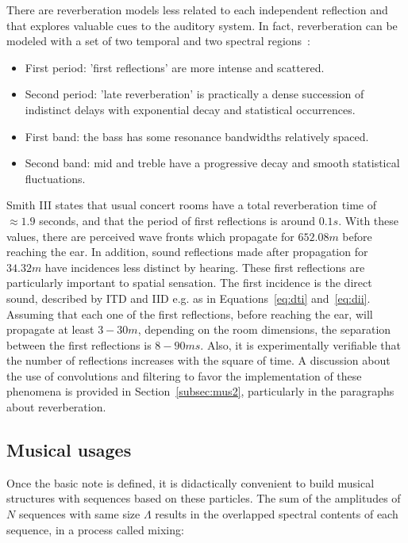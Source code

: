 There are reverberation models less related to each independent reflection and that explores valuable cues to the auditory system. In fact, reverberation can be modeled with a set of two temporal and two spectral regions~\cite{JOSPhy}:
\begin{itemize}
   \item First period: 'first reflections' are more intense and scattered.
   \item Second period: 'late reverberation' is practically a dense succession of indistinct delays with exponential decay and statistical occurrences.
   \item First band: the bass has some resonance bandwidths relatively spaced.
   \item Second band: mid and treble have a progressive decay and smooth statistical fluctuations.
\end{itemize}

Smith III states that usual concert rooms have a total reverberation time of $\approx 1.9$ seconds, and that the period of first reflections is around $0.1s$.
With these values, there are perceived wave fronts which propagate for $652.08m$ before reaching the ear.
In addition, sound reflections made after propagation for
$34.32m$ have incidences less distinct by hearing.
These first reflections are particularly important to spatial sensation.
The first incidence is the direct sound, described by ITD and IID e.g. as in Equations~\ref{eq:dti} and~\ref{eq:dii}.
Assuming that each one of the first reflections, before reaching the ear,
will propagate at least $3-30m$, depending on the room dimensions,
the separation between the first reflections is $8-90ms$.
Also, it is experimentally verifiable that the number of reflections increases with the square of time.
A discussion about the use of convolutions and filtering to favor the implementation of these phenomena is provided in Section~\ref{subsec:mus2}, particularly in the paragraphs about reverberation.~\cite{JOSPhy}

\subsection{Musical usages}\label{subsec:basMus}
Once the basic note is defined, it is didactically convenient to build musical structures with sequences based on these particles.
The sum of the amplitudes of $N$ sequences with same size $\Lambda$ results in the overlapped spectral contents of each sequence, in a process called mixing:

